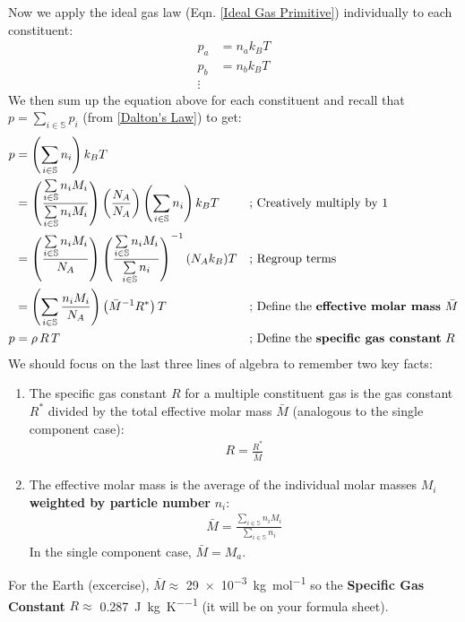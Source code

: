 Now we apply the ideal gas law (Eqn. \ref{Ideal Gas Primitive}) individually to each constituent:
\begin{align*}
    p_a&=n_ak_BT\\
    p_b&=n_bk_BT\\
    \vdots
\end{align*}
We then sum up the equation above for each constituent and recall that $p=\sum\limits_{i\in\mathbb{S}} p_i$ (from \ref{Dalton's Law}) to get:
\begin{align*}
    p&=\left(\sum\limits_{i\in\mathbb{S}} n_i\right)k_BT
    &&
    \\
    &= \left(\frac{\sum\limits_{i\in\mathbb{S}} n_iM_i}{\sum\limits_{i\in\mathbb{S}} n_iM_i}\right)\left(\frac{N_A}{N_A}\right)\left(\sum\limits_{i\in\mathbb{S}} n_i\right)k_BT
    &\text{; }&\text{Creatively multiply by }1
    \\
    &= \left(\frac{\sum\limits_{i\in\mathbb{S}} n_iM_i}{N_A}\right)\left(\frac{\sum\limits_{i\in\mathbb{S}} n_iM_i}{\sum\limits_{i\in\mathbb{S}} n_i}\right)^{-1}(N_Ak_B)T
    &\text{; }&\text{Regroup terms}
    \\
    &=\left(\sum\limits_{i\in\mathbb{S}}\frac{n_iM_i}{N_A}\right)\left(\bar{M}^{-1}R^*\right)T 
    &\text{; }&\text{Define the \textbf{effective molar mass} }\bar{M}
    \\
    p&=\rho\, R \,T
    &\text{; }&\text{Define the \textbf{specific gas constant} $R$}
\end{align*}
We should focus on the last three lines of algebra to remember two key facts:
\begin{enumerate}
    \item The specific gas constant $R$ for a multiple constituent gas is the gas constant $R^*$ divided by the total effective molar mass $\bar{M}$ (analogous to the single component case):
    \begin{align}
        R=\frac{R^*}{\bar{M}}
    \end{align}
    \item The effective molar mass is the average of the individual molar masses $M_i$ \textbf{weighted by particle number} $n_i$:
    \begin{align}
        \boxed{\bar{M} =\frac{\sum\limits_{i\in\mathbb{S}} n_iM_i}{\sum\limits_{i\in\mathbb{S}} n_i}}
    \end{align}
    In the single component case, $\bar{M}=M_a$.
\end{enumerate}

For the Earth (excercise), $\bar{M}\approx$ \qty{29e-3}{\kilogram\per\mole} so the \textbf{Specific Gas Constant} $R\approx$ \qty{0.287}{\joule\per\kilogram\per\kelvin} (it will be on your formula sheet).


